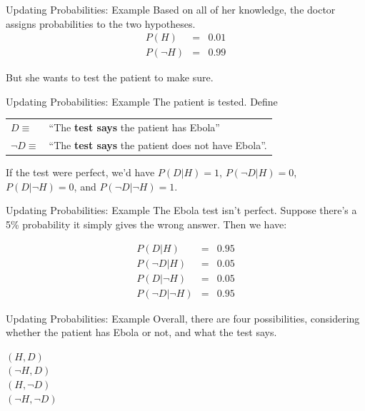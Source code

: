 \documentclass{beamer}
\begin{document}
\begin{frame}[t]{Updating Probabilities: Example}
Based on all of her knowledge, the doctor assigns probabilities to the two
hypotheses.
\begin{eqnarray*}
P(H) &=& 0.01\\
P(\neg H) &=& 0.99
\end{eqnarray*}

But she wants to test the patient to make sure.
\end{frame}



\begin{frame}[t]{Updating Probabilities: Example}
The patient is tested. Define

\begin{center}
\begin{tabular}{ll}
$D \equiv $ & ``The {\bf test says} the patient has Ebola''\\
$\neg D \equiv $ & ``The {\bf test says} the patient does not have Ebola''.
\end{tabular}
\end{center}

If the test were perfect, we'd have $P(D | H) = 1$, $P(\neg D | H) = 0$,
$P(D | \neg H) = 0$, and $P(\neg D | \neg H) = 1$.
\end{frame}


\begin{frame}[t]{Updating Probabilities: Example}
The Ebola test isn't perfect. Suppose there's a 5\% probability it simply gives
the wrong answer. Then we have:

\begin{eqnarray*}
P(D | H)   &=& 0.95\\
P(\neg D | H) &=& 0.05\\
P(D | \neg H)   &=& 0.05\\
P(\neg D | \neg H) &=& 0.95
\end{eqnarray*}

\end{frame}

\begin{frame}[t]{Updating Probabilities: Example}
Overall, there are four possibilities, considering whether the patient has
Ebola or not, and what the test says.

\begin{center}
$(H, D)$\\
$(\neg H, D)$\\
$(H, \neg D)$\\
$(\neg H, \neg D)$
\end{center}


\end{frame}
\end{document}
